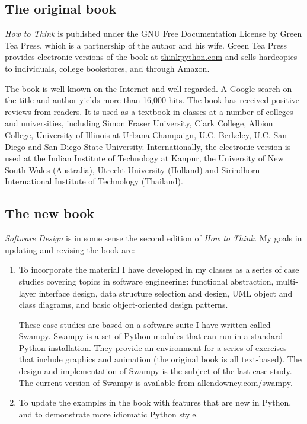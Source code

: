 \documentclass{article}
\begin{document}
\subsection*{The original book}

{\em How to Think} is published under the GNU Free Documentation
License by Green Tea Press, which is a partnership of the author and
his wife.  Green Tea Press provides electronic versions of the book at
\url{thinkpython.com} and sells hardcopies to individuals, college
bookstores, and through Amazon.

The book is well known on the Internet and well regarded.  A Google
search on the title and author yields more than 16,000 hits.  The book
has received positive reviews from readers.  It is used as a textbook
in classes at a number of colleges and universities, including Simon
Fraser University, Clark College, Albion College, University of
Illinois at Urbana-Champaign, U.C. Berkeley, U.C. San Diego and San
Diego State University.  Internationally, the electronic version is
used at the Indian Institute of Technology at Kanpur, the University
of New South Wales (Australia), Utrecht University (Holland) and
Sirindhorn International Institute of Technology (Thailand).


\subsection*{The new book}

{\em Software Design} is in some sense the second edition of {\em How to
Think.}  My goals in updating and revising the book are:

\begin{enumerate}

\item To incorporate the material I have developed in my classes as a
series of case studies covering topics in software engineering:
functional abstraction, multi-layer interface design, data structure
selection and design, UML object and class diagrams, and basic
object-oriented design patterns.

These case studies are based on a software suite I have written called
Swampy.  Swampy is a set of Python modules that can run in a standard
Python installation.  They provide an environment for a series of
exercises that include graphics and animation (the original book is
all text-based).  The design and implementation of Swampy is the
subject of the last case study.  The current version of Swampy
is available from \url{allendowney.com/swampy}.

\item To update the examples in the book with features that are new in
Python, and to demonstrate more idiomatic Python style.

\end{enumerate}
\end{document}
